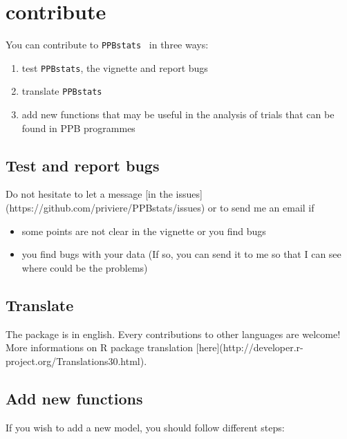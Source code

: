 \documentclass{book}\usepackage[]{graphicx}\usepackage[]{color}
\newcommand{\pack}{\texttt{PPBstats}}
\begin{document}
\chapter{contribute}
\label{contribute}

You can contribute to \pack~ in three ways:

\begin{enumerate}
\item test \pack, the vignette and report bugs
\item translate \pack
\item add new functions that may be useful in the analysis of trials that can be found in PPB programmes
\end{enumerate}

\section{Test and report bugs}

Do not hesitate to let a message [in the issues](https://github.com/priviere/PPBstats/issues) or to send me an email if
\begin{itemize}
\item some points are not clear in the vignette or you find bugs
\item you find bugs with your data (If so, you can send it to me so that I can see where could be the problems)
\end{itemize}


\section{Translate}

The package is in english. 
Every contributions to other languages are welcome!
More informations on R package translation [here](http://developer.r-project.org/Translations30.html).

\section{Add new functions}

If you wish to add a new model, you should follow different steps:
\end{document}
